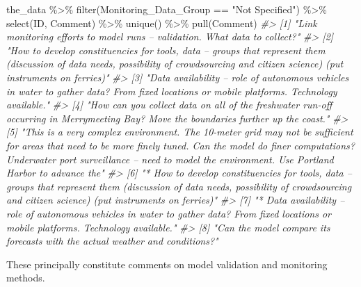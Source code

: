 \documentclass[
]{article}
\newenvironment{Shaded}{\begin{snugshade}}{\end{snugshade}}
\newcommand{\CommentTok}[1]{\textcolor[rgb]{0.56,0.35,0.01}{\textit{#1}}}
\newcommand{\FunctionTok}[1]{\textcolor[rgb]{0.00,0.00,0.00}{#1}}
\newcommand{\NormalTok}[1]{#1}
\newcommand{\SpecialCharTok}[1]{\textcolor[rgb]{0.00,0.00,0.00}{#1}}
\newcommand{\StringTok}[1]{\textcolor[rgb]{0.31,0.60,0.02}{#1}}
\begin{document}
\begin{Shaded}
\begin{Highlighting}[]
\NormalTok{the\_data }\SpecialCharTok{\%\textgreater{}\%}
  \FunctionTok{filter}\NormalTok{(Monitoring\_Data\_Group }\SpecialCharTok{==} \StringTok{"Not Specified"}\NormalTok{) }\SpecialCharTok{\%\textgreater{}\%}
  \FunctionTok{select}\NormalTok{(ID, Comment) }\SpecialCharTok{\%\textgreater{}\%}
  \FunctionTok{unique}\NormalTok{() }\SpecialCharTok{\%\textgreater{}\%}
  \FunctionTok{pull}\NormalTok{(Comment)}
\CommentTok{\#\textgreater{} [1] "Link monitoring efforts to model runs – validation. What data to collect?"                                                                                                                                                                                      }
\CommentTok{\#\textgreater{} [2] "How to develop constituencies for tools, data – groups that represent them (discussion of data needs, possibility of crowdsourcing and citizen science) (put instruments on ferries)"                                                                           }
\CommentTok{\#\textgreater{} [3] "Data availability – role of autonomous vehicles in water to gather data?  From fixed locations or mobile platforms.  Technology available."                                                                                                                     }
\CommentTok{\#\textgreater{} [4] "How can you collect data on all of the freshwater run{-}off occurring in Merrymeeting Bay? Move the boundaries further up the coast."                                                                                                                             }
\CommentTok{\#\textgreater{} [5] "This is a very complex environment. The 10{-}meter grid may not be sufficient for areas that need to be more finely tuned. Can the model do finer computations? Underwater port surveillance – need to model the environment.  Use Portland Harbor to advance the"}
\CommentTok{\#\textgreater{} [6] "* How to develop constituencies for tools, data – groups that represent them (discussion of data needs, possibility of crowdsourcing and citizen science) (put instruments on ferries)"                                                                         }
\CommentTok{\#\textgreater{} [7] "* Data availability – role of autonomous vehicles in water to gather data?  From fixed locations or mobile platforms.  Technology available."                                                                                                                   }
\CommentTok{\#\textgreater{} [8] "Can the model compare its forecasts with the actual weather and conditions?"}
\end{Highlighting}
\end{Shaded}

These principally constitute comments on model validation and monitoring
methods.
\end{document}
